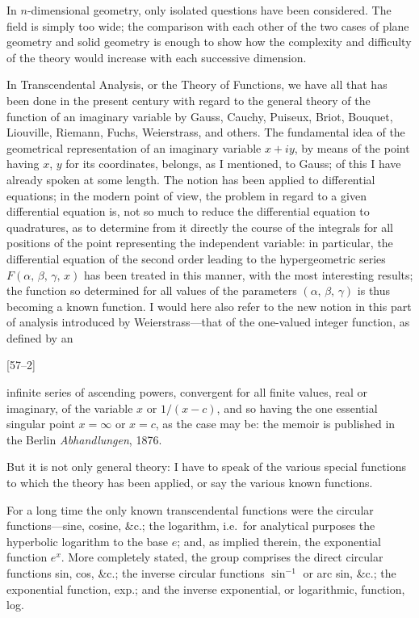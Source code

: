 \documentclass[12pt,a4paper,oneside]{book}
\newcommand{\paperref}[1]{\par\noindent\hfill[#1]\hfill\null\par}
\begin{document}
In $n$-dimensional geometry, only isolated questions have been considered. The field is simply too wide; the comparison with each other of the two cases of plane geometry and solid geometry is enough to show how the complexity and difficulty of the theory would increase with each successive dimension.

In Transcendental Analysis, or the Theory of Functions, we have all that has been done in the present century with regard to the general theory of the function of an imaginary variable by Gauss, Cauchy, Puiseux, Briot, Bouquet, Liouville, Riemann, Fuchs, Weierstrass, and others. The fundamental idea of the geometrical representation of an imaginary variable $x+iy$, by means of the point having $x$, $y$ for its coordinates, belongs, as I mentioned, to Gauss; of this I have already spoken at some length. The notion has been applied to differential equations; in the modern point of view, the problem in regard to a given differential equation is, not so much to reduce the differential equation to quadratures, as to determine from it directly the course of the integrals for all positions of the point representing the independent variable: in particular, the differential equation of the second order leading to the hypergeometric series $F(\alpha,\,\beta,\,\gamma,\,x)$ has been treated in this manner, with the most interesting results; the function so determined for all values of the parameters $(\alpha,\,\beta,\,\gamma)$ is thus becoming a known function. I would here also refer to the new notion in this part of analysis introduced by Weierstrass---that of the one-valued integer function, as defined by an

\paperref{57--2}
\newpage
infinite series of ascending powers, convergent for all finite values, real or imaginary, of the variable $x$ or $1/(x-c)$, and so having the one essential singular point $x=\infty$ or $x=c$, as the case may be: the memoir is published in the Berlin \textit{Abhandlungen}, 1876.

But it is not only general theory: I have to speak of the various special functions to which the theory has been applied, or say the various known functions.

For a long time the only known transcendental functions were the circular functions---sine, cosine, \&c.; the logarithm, i.e.\ for analytical purposes the hyperbolic logarithm to the base $e$; and, as implied therein, the exponential function $e^{x}$. More completely stated, the group comprises the direct circular functions sin, cos, \&c.; the inverse circular functions $\sin^{-1}$ or arc sin, \&c.; the exponential function, exp.; and the inverse exponential, or logarithmic, function, log.
\end{document}
